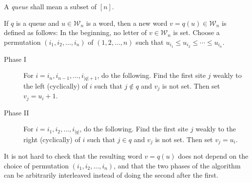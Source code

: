 \documentclass[reqno]{amsart}
\newcommand{\0}{\phantom{c}}
\DeclareMathOperator{\wt}{wt} %
\newcommand{\mm}{\mathbf{m}}
\newcommand{\mcW}{\mathcal{W}}
\let\prodnonlimits\prod
\renewcommand{\prod}{\prodnonlimits\limits}
\newcommand{\abs}[1]{\left| #1 \right|}
\newcommand{\tup}[1]{\left( #1 \right)}
\newcommand{\ive}[1]{\left[ #1 \right]}
\newcommand{\defn}[1]{{\color{darkred}\emph{#1}}} %
\theoremstyle{plain}
\theoremstyle{definition}
\newtheorem{remark}[thm]{Remark}
\numberwithin{equation}{section}
\begin{document}

A \defn{queue} shall mean a subset of $\ive{n}$.

If $q$ is a queue and $u \in \mcW_n$ is a word, then a new word $v = q(u) \in \mcW_n$ is defined as follows:
In the beginning, no letter of $v \in \mcW_n$ is set.
Choose a permutation $\tup{i_1, i_2, \ldots, i_n}$ of $\tup{1, 2, \ldots, n}$
such that $u_{i_1} \leq u_{i_2} \leq \cdots \leq u_{i_n}$.

\begin{description}
\item[Phase I]
  For $i = i_n, i_{n-1}, \ldots, i_{\abs{q}+1}$, do the following.
    Find the first site $j$ weakly to the left (cyclically) of $i$ such that $j \notin q$ and $v_j$ is not set.
    Then set $v_j = u_i + 1$.

\item[Phase II]
  For $i = i_1, i_2, \ldots, i_{\abs{q}}$, do the following.
    Find the first site $j$ weakly to the right (cyclically) of $i$ such that $j \in q$ and $v_j$ is not set.
    Then set $v_j = u_i$.
\end{description}

It is not hard to check that the resulting word $v = q(u)$ does not depend on the choice of permutation $(i_1, i_2, \dotsc, i_n)$,
and that the two phases of the algorithm can be arbitrarily interleaved instead of doing the second after the first.

\end{document}
